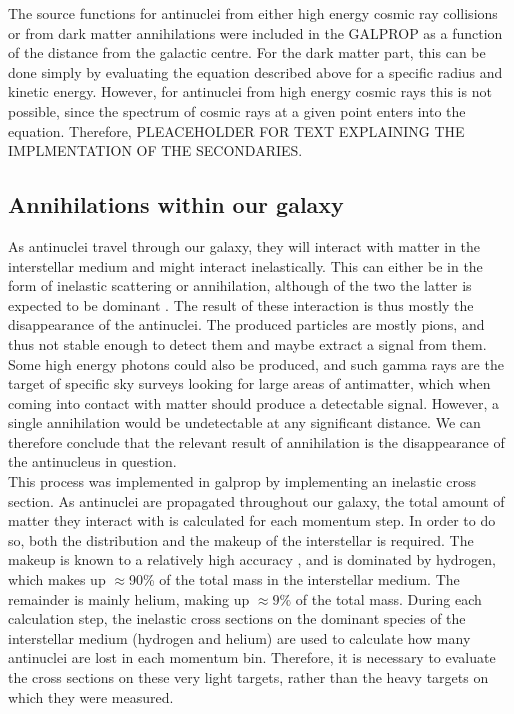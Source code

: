 The source functions for antinuclei from either high energy cosmic ray collisions or from dark matter annihilations were included in the GALPROP as a function of the distance from the galactic centre. For the dark matter part, this can be done simply by evaluating the equation described above for a specific radius and kinetic energy. However, for antinuclei from high energy cosmic rays this is not possible, since the spectrum of cosmic rays at a given point enters into the equation. Therefore, PLEACEHOLDER FOR TEXT EXPLAINING THE IMPLMENTATION OF THE SECONDARIES.

\subsection{Annihilations within our galaxy}\label{sec:ResAnnInOurGalaxy}
As antinuclei travel through our galaxy, they will interact with matter in the interstellar medium and might interact inelastically. This can either be in the form of inelastic scattering or annihilation, although of the two the latter is expected to be dominant \cite{}. The result of these interaction is thus mostly the disappearance of the antinuclei. The produced particles are mostly pions, and thus not stable enough to detect them and maybe extract a signal from them. Some high energy photons could also be produced, and such gamma rays are the target of specific sky surveys looking for large areas of antimatter, which when coming into contact with matter should produce a detectable signal. However, a single annihilation would be undetectable at any significant distance. We can therefore conclude that the relevant result of annihilation is the disappearance of the antinucleus in question. \\

This process was implemented in galprop by implementing an inelastic cross section. As antinuclei are propagated throughout our galaxy, the total amount of matter they interact with is calculated for each momentum step. In order to do so, both the distribution and the makeup of the interstellar is required. The makeup is known to a relatively high accuracy \cite{}, and is dominated by hydrogen, which makes up $\approx$90\% of the total mass in the interstellar medium. The remainder is mainly helium, making up $\approx 9\%$ of the total mass. During each calculation step, the inelastic cross sections on the dominant species of the interstellar medium (hydrogen and helium) are used to calculate how many antinuclei are lost in each momentum bin. Therefore, it is necessary to evaluate the cross sections on these very light targets, rather than the heavy targets on which they were measured.\\

